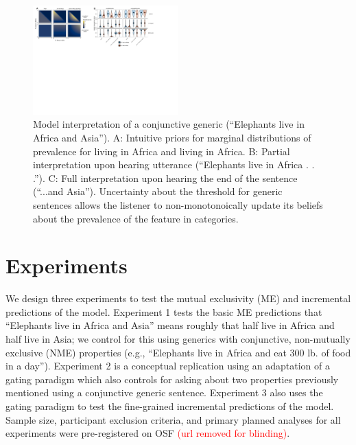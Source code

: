 \documentclass[10pt,letterpaper]{article}
\providecommand{\tightlist}{%
  \setlength{\itemsep}{0pt}\setlength{\parskip}{0pt}}
\newcommand{\denote}[1]{\mbox{ $[\![ #1 ]\!]$}}
\newcommand{\red}[1]{{\textcolor{Red}{#1}}}
\begin{document}
\begin{figure}[h]
  \centering
    \includegraphics[width=0.5\textwidth]{model}
  \caption{
  Model interpretation of a conjunctive generic (``Elephants live in Africa and Asia''). A: Intuitive priors for marginal distributions of prevalence for living in Africa and living in Africa. B: Partial interpretation upon hearing utterance (“Elephants live in Africa . . .”). C: Full interpretation upon hearing the end of the sentence (``...and Asia''). Uncertainty about the threshold for generic sentences allows the listener to non-monotonoically update its beliefs about the prevalence of the feature in categories.
  }
  \label{fig:model}
\end{figure}



%


\section{Experiments}

We design three experiments to test the mutual exclusivity (ME) and incremental predictions of the model. 
Experiment 1 tests the basic ME predictions that ``Elephants live in Africa and Asia'' means roughly that half live in Africa and half live in Asia; we control for this using generics with conjunctive, non-mutually exclusive (NME) properties (e.g., ``Elephants live in Africa and eat 300 lb. of food in a day''). 
Experiment 2 is a conceptual replication using an adaptation of a gating paradigm \cite{Grosjean1980} which also controls for asking about two properties previously mentioned using a conjunctive generic sentence. 
Experiment 3 also uses the gating paradigm to test the fine-grained incremental predictions of the model.
Sample size, participant exclusion criteria, and primary planned analyses for all experiments were pre-registered on OSF \red{(url removed for blinding)}.
\end{document}
